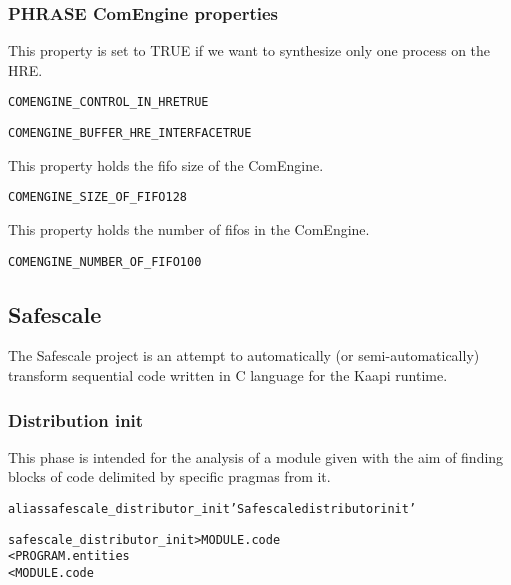 \documentclass[a4paper]{report}
\newenvironment{PipsProp}{\begin{alltt}}{\end{alltt}}
\newenvironment{PipsMake}{\begin{alltt}}{\end{alltt}}
\begin{document}
\subsubsection{PHRASE ComEngine properties}

This property is set to TRUE if we want to synthesize only one
process on the HRE.
\begin{PipsProp}
COMENGINE_CONTROL_IN_HRE TRUE
\end{PipsProp}

\begin{PipsProp}
COMENGINE_BUFFER_HRE_INTERFACE TRUE
\end{PipsProp}

This property holds the fifo size of the ComEngine.
\begin{PipsProp}
COMENGINE_SIZE_OF_FIFO 128
\end{PipsProp}

This property holds the number of fifos in the ComEngine.
\begin{PipsProp}
COMENGINE_NUMBER_OF_FIFO 100
\end{PipsProp}


\subsection{Safescale}
\label{subsubsection_safescale_module_analysis}

The Safescale project is an attempt to automatically (or semi-automatically)
transform sequential code written in C language for the Kaapi runtime.

\subsubsection{Distribution init}

This phase is intended for the analysis of a module given with the aim of finding
blocks of code delimited by specific pragmas from it.

\begin{PipsMake}
alias safescale_distributor_init 'Safescale distributor init'

safescale_distributor_init                  > MODULE.code
        < PROGRAM.entities
        < MODULE.code
\end{PipsMake}
\end{document}
